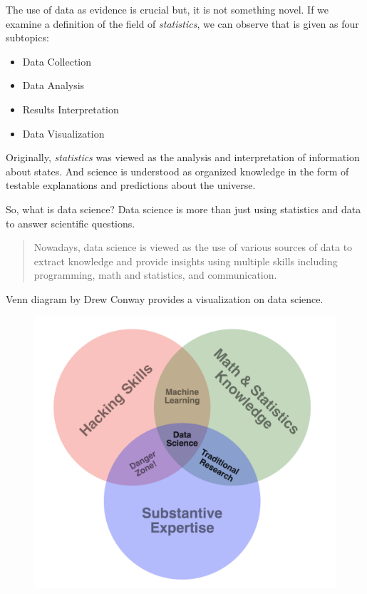 \documentclass[
  letterpaper,
  DIV=11,
  numbers=noendperiod]{scrreprt}
\providecommand{\tightlist}{%
  \setlength{\itemsep}{0pt}\setlength{\parskip}{0pt}}\usepackage{longtable,booktabs,array}
\begin{document}

The use of data as evidence is crucial but, it is not something novel.
If we examine a definition of the field of \emph{statistics}, we can
observe that is given as four subtopics:

\begin{itemize}
\tightlist
\item
  Data Collection
\item
  Data Analysis
\item
  Results Interpretation
\item
  Data Visualization
\end{itemize}

Originally, \emph{statistics} was viewed as the analysis and
interpretation of information about states. And science is understood as
organized knowledge in the form of testable explanations and predictions
about the universe.

So, what is data science? Data science is more than just using
statistics and data to answer scientific questions.

\begin{quote}
Nowadays, data science is viewed as the use of various sources of data
to extract knowledge and provide insights using multiple skills
including programming, math and statistics, and communication.
\end{quote}

Venn diagram by Drew Conway provides a visualization on data science.

\begin{figure}

{\centering \includegraphics{img/DSvenn.png}

}

\end{figure}
\end{document}
